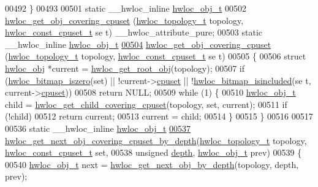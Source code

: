 \begin{DoxyCode}
00492 \}
00493 
00501 \textcolor{keyword}{static} \_\_hwloc\_inline \hyperlink{a00016}{hwloc_obj_t}
00502 \hyperlink{a00055_ga68300dd0ee9c36a7a90f275a59e9af28}{hwloc_get_obj_covering_cpuset} (\hyperlink{a00039_ga9d1e76ee15a7dee158b786c30b6a6e38}{hwloc_topology_t} topology, \hyperlink{a00040_ga1f784433e9b606261f62d1134f6a3b25}{hwloc_const_cpuset_t} \textcolor{keyword}{se
      t}) \_\_hwloc\_attribute\_pure;
00503 static \_\_hwloc\_inline \hyperlink{a00016}{hwloc_obj_t}
\hypertarget{a00031_source_l00504}{}\hyperlink{a00055_ga68300dd0ee9c36a7a90f275a59e9af28}{00504} \hyperlink{a00055_ga68300dd0ee9c36a7a90f275a59e9af28}{hwloc_get_obj_covering_cpuset} (\hyperlink{a00039_ga9d1e76ee15a7dee158b786c30b6a6e38}{hwloc_topology_t} topology, \hyperlink{a00040_ga1f784433e9b606261f62d1134f6a3b25}{hwloc_const_cpuset_t} se
      t)
00505 \{
00506   \textcolor{keyword}{struct }\hyperlink{a00016}{hwloc_obj} *current = \hyperlink{a00053_gadbf58f6e187efbdb3cd9a8e30311b7d7}{hwloc_get_root_obj}(topology);
00507   \textcolor{keywordflow}{if} (\hyperlink{a00065_gaa94fed35d2a598bc4a8657b6955b7bf5}{hwloc_bitmap_iszero}(\textcolor{keyword}{set}) || !current->\hyperlink{a00016_a67925e0f2c47f50408fbdb9bddd0790f}{cpuset} || !\hyperlink{a00065_gaae29e14a926c198e8f91e6e4790621e7}{hwloc_bitmap_isincluded}(\textcolor{keyword}{se
      t}, current->\hyperlink{a00016_a67925e0f2c47f50408fbdb9bddd0790f}{cpuset}))
00508     \textcolor{keywordflow}{return} NULL;
00509   \textcolor{keywordflow}{while} (1) \{
00510     \hyperlink{a00016}{hwloc_obj_t} child = \hyperlink{a00055_ga69a22cc76c88115aee7b7e6fc53fca7d}{hwloc_get_child_covering_cpuset}(topology, \textcolor{keyword}{set}, current);
00511     \textcolor{keywordflow}{if} (!child)
00512       \textcolor{keywordflow}{return} current;
00513     current = child;
00514   \}
00515 \}
00516 
00517 
00536 \textcolor{keyword}{static} \_\_hwloc\_inline \hyperlink{a00016}{hwloc_obj_t}
\hypertarget{a00031_source_l00537}{}\hyperlink{a00056_ga2f9a4ec15e9cfae8c21501257a51ce5b}{00537} \hyperlink{a00056_ga2f9a4ec15e9cfae8c21501257a51ce5b}{hwloc_get_next_obj_covering_cpuset_by_depth}(\hyperlink{a00039_ga9d1e76ee15a7dee158b786c30b6a6e38}{hwloc_topology_t} topology, 
      \hyperlink{a00040_ga1f784433e9b606261f62d1134f6a3b25}{hwloc_const_cpuset_t} \textcolor{keyword}{set},
00538                                             \textcolor{keywordtype}{unsigned} \hyperlink{a00016_a9d82690370275d42d652eccdea5d3ee5}{depth}, \hyperlink{a00016}{hwloc_obj_t} prev)
00539 \{
00540   \hyperlink{a00016}{hwloc_obj_t} next = \hyperlink{a00053_gab7c1dce3f42ece5bfa621e87cf332418}{hwloc_get_next_obj_by_depth}(topology, depth, prev);

\end{DoxyCode}
